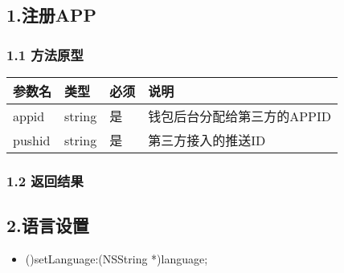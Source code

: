 \documentclass[letterpaper,10pt,english]{sphinxmanual}
\begin{document}
\subsection{1.注册APP}
\label{\detokenize{BCBWalletSDK_u63a5_u53e3_u8bf4_u660e:app}}

\subsubsection{1.1 方法原型}
\label{\detokenize{BCBWalletSDK_u63a5_u53e3_u8bf4_u660e:id5}}



\begin{savenotes}\sphinxattablestart
\centering
\begin{tabulary}{\linewidth}[t]{|T|T|T|T|}
\hline
\sphinxstyletheadfamily 
参数名
&\sphinxstyletheadfamily 
类型
&\sphinxstyletheadfamily 
必须
&\sphinxstyletheadfamily 
说明
\\
\hline
appid
&
string
&
是
&
钱包后台分配给第三方的APPID
\\
\hline
pushid
&
string
&
是
&
第三方接入的推送ID
\\
\hline
\end{tabulary}
\par
\sphinxattableend\end{savenotes}


\subsubsection{1.2 返回结果}
\label{\detokenize{BCBWalletSDK_u63a5_u53e3_u8bf4_u660e:id6}}

\begin{sphinxVerbatim}[commandchars=\\\{\}]
 
\end{sphinxVerbatim}


\begin{sphinxVerbatim}[commandchars=\\\{\}]
 
\end{sphinxVerbatim}


\subsection{2.语言设置}
\label{\detokenize{BCBWalletSDK_u63a5_u53e3_u8bf4_u660e:id7}}\begin{itemize}
\item {} 
()setLanguage:(NSString *)language;

\end{itemize}
\end{document}
